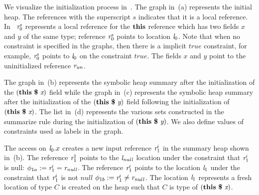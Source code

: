We visualize the initialization process in~. The
graph in~(a) represents the initial heap. The
references with the superscript $s$ indicates that it is a local
reference. In~ $\emph{r}_0^s$ represents a local
reference for the $\textbf{this}$ reference which has two fields $x$
and $y$ of the same type; reference $\emph{r}_0^s$ points to location
$\emph{l}_0$. Note that when no constraint is specified in the graphs, then
there is a implicit $\mathit{true}$ constraint, for example, $\emph{r}_0^s$
points to $\emph{l}_0$ on the constraint $\mathit{true}$. The fields $x$ and
$y$ point to the uninitialized reference $\emph{r}_\mathit{un}$.


The graph in~(b) represents the symbolic heap
summary after the initialization of the $\lp\cfgt{this}\  \cfgt{\$}\ \cfgnt{x}\rp$ field while
the graph in~(c) represents the symbolic heap
summary after the initialization of the $(\textbf{this}\  \textbf{\$}\ \emph{y})$ field
following the initialization of $\lp\cfgt{this}\  \cfgt{\$}\ \cfgnt{x}\rp$. The list
in~(d) represents the various sets constructed in
the summarize rule during the initialization of $(\textbf{this}\  \textbf{\$}\ \emph{y})$. We
also define values of constraints used as labels in the graph.

The access on $\emph{l}_0.x$ creates a new input reference $\emph{r}_1^i$ in the
summary heap shown in~(b). The reference $\emph{r}_1^1$
points to the $\emph{l}_\mathit{null}$ location under the constraint that
$\emph{r}_1^i$ is null: $\phi_{1a} := \emph{r}_1^i = \emph{r}_\mathit{null}$. The reference
$\emph{r}_1^i$ points to the location $\emph{l}_1$ under the constraint that $\emph{r}_1^i$
is not $\mathit{null}$ $\phi_{1b} :=\emph{r}_1^i \neq \emph{r}_\mathit{null}$. The
location $\emph{l}_1$ represents a fresh location of type $C$ is created on
the heap such that $C$ is type of $\lp\cfgt{this}\  \cfgt{\$}\ \cfgnt{x}\rp$.

